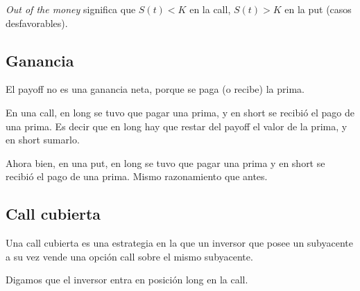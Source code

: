\documentclass[a4paper, 12pt]{article}
\theoremstyle{definition}
\begin{document}
\textit{Out of the money} significa que $S(t) < K$ en la call, $S(t) > K$ en la
put (casos desfavorables).

\subsection{Ganancia}

El payoff no es una ganancia neta, porque se paga (o recibe) la prima. 

En una call, en long se tuvo que pagar una prima, y en short se recibió el pago
de una prima. Es decir que en long hay que restar del payoff el valor de la
prima, y en short sumarlo.

Ahora bien, en una put, en long se tuvo que pagar una prima y en short se
recibió el pago de una prima. Mismo razonamiento que antes.

\subsection{Call cubierta}

Una call cubierta es una estrategia en la que un inversor que posee un
subyacente a su vez vende una opción call sobre el mismo subyacente. 

Digamos que el inversor entra en posición long en la call.
\end{document}
